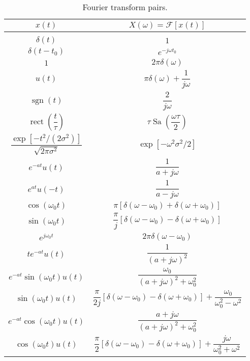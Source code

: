 \documentclass{report}
\begin{document}
\begin{table}
    \centering
    \caption{Fourier transform pairs.}
    \label{fourier_pairs}
    \begin{tabular}{|c|c|}
        \hline
        $x(t)$ & $X(\omega)=\mathcal{F}[x(t)]$ \\[0.15cm]
        \hline
        & \\[0.1cm]
        $\delta(t)$ & $1$ \\[0.5cm]
        $\delta(t-t_0)$ & $e^{-j\omega t_0}$ \\[0.5cm]
        $1$ & $2\pi\delta(\omega)$ \\[0.5cm]
        $u(t)$ & $\pi\delta(\omega) + \dfrac{1}{j\omega}$ \\[0.5cm]
        $\operatorname{sgn}(t)$ & $\dfrac{2}{j\omega}$ \\[0.5cm]
        $\operatorname{rect}\left(\dfrac{t}{\tau}\right)$ & $\tau\operatorname{Sa}\left(\dfrac{\omega\tau}{2}\right)$ \\[0.5cm]
        $\dfrac{\exp[-t^2/(2\sigma^2)]}{\sqrt{2\pi\sigma^2}}$ & $\exp[-\omega^2\sigma^2/2]$ \\[0.5cm]
        $e^{-at}u(t)$ & $\dfrac{1}{a+j\omega}$ \\[0.5cm]
        $e^{at}u(-t)$ & $\dfrac{1}{a-j\omega}$ \\[0.5cm]
        $\cos(\omega_0 t)$ & $\pi[\delta(\omega-\omega_0) + \delta(\omega+\omega_0)]$ \\[0.5cm]
        $\sin(\omega_0 t)$ & $\dfrac{\pi}{j}[\delta(\omega-\omega_0) - \delta(\omega+\omega_0)]$ \\[0.5cm]
        $e^{j\omega_0 t}$ & $2\pi\delta(\omega-\omega_0)$ \\[0.5cm]
        $te^{-at}u(t)$ & $\dfrac{1}{(a+j\omega)^2}$ \\[0.5cm]
        $e^{-at}\sin(\omega_0 t)u(t)$ & $\dfrac{\omega_0}{(a+j\omega)^2+\omega_0^2}$ \\[0.5cm]
        $\sin(\omega_0 t)u(t)$ & $\dfrac{\pi}{2j}[\delta(\omega-\omega_0) - \delta(\omega+\omega_0)] + \dfrac{\omega_0}{\omega_0^2-\omega^2}$ \\[0.5cm]
        $e^{-at}\cos(\omega_0 t)u(t)$ & $\dfrac{a+j\omega}{(a+j\omega)^2+\omega_0^2}$ \\[0.5cm]
        $\cos(\omega_0 t)u(t)$ & $\dfrac{\pi}{2}[\delta(\omega-\omega_0) - \delta(\omega+\omega_0)] + \dfrac{j\omega}{\omega_0^2+\omega^2}$ \\[0.5cm]
        \hline
    \end{tabular}
\end{table}
\end{document}
